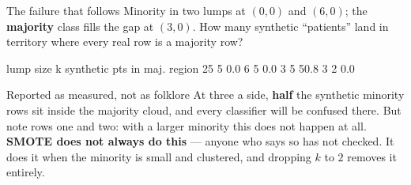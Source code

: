 \documentclass[aspectratio=169]{beamer}
\begin{document}
\begin{frame}[fragile,shrink=8]{The failure that follows}
Minority in two lumps at $(0,0)$ and $(6,0)$; the \textbf{majority} class
fills the gap at $(3,0)$. How many synthetic ``patients'' land in territory
where every real row is a majority row?
\begin{outblk}
lump size          k synthetic pts in maj. region
      25          5                       0.0%
       6          5                       0.0%
       3          5                      50.8%
       3          2                       0.0%
\end{outblk}
\begin{alertblock}{Reported as measured, not as folklore}
  \footnotesize At three a side, \textbf{half} the synthetic minority rows sit
  inside the majority cloud, and every classifier will be confused there.
  But note rows one and two: with a larger minority this does not happen at
  all. \textbf{SMOTE does not always do this} --- anyone who says so has not
  checked. It does it when the minority is small and clustered, and dropping
  $k$ to $2$ removes it entirely.
\end{alertblock}
\end{frame}
\end{document}
